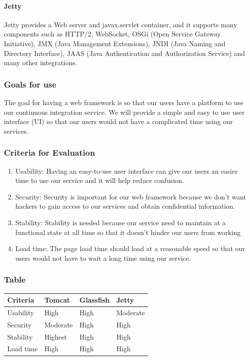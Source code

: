 \documentclass[10pt,letterpaper,onecolumn,draftclsnofoot]{IEEEtran}
\begin{document}
\paragraph{Jetty}
Jetty provides a Web server and javax.servlet container, and it supports many components such as HTTP/2, WebSocket, OSGi (Open Service Gateway Initiative), JMX (Java Management Extensions), JNDI (Java Naming and Directory Interface), JAAS (Java Authentication and Authorization Service) and many other integrations.
\subsubsection{Goals for use}
The goal for having a web framework is so that our users have a platform to use our continuous integration service.
We will provide a simple and easy to use user interface (UI) so that our users would not have a complicated time using our services.
\subsubsection{Criteria for Evaluation}
\begin{enumerate}
  \item Usability: Having an easy-to-use user interface can give our users an easier time to use our service and it will help reduce confusion.
  \item Security: Security is important for our web framework because we don't want hackers to gain access to our services and obtain confidential information.
  \item Stability: Stability is needed because our service need to maintain at a functional state at all time so that it doesn't hinder our users from working
  \item Load time: The page load time should load at a reasonable speed so that our users would not have to wait a long time using our service.
\end{enumerate}
\subsubsection{Table}
\begin{center}
  \begin{tabular}{llll}
    Criteria & Tomcat & Glassfish & Jetty \\ \midrule
    Usability       & High & High & Moderate \\ \midrule
    Security           & Moderate & High & High \\ \midrule
    Stability      & Highest & High & High \\ \midrule
    Load time  & High & High & High \\ \bottomrule
  \end{tabular}
\end{center}
\end{document}
